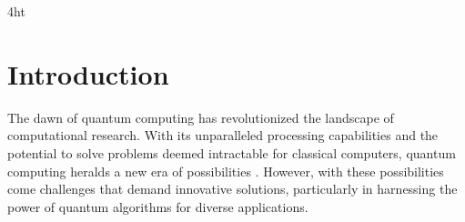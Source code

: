 \documentclass[
  a4paper,  %
  twoside,  %
  bibliography=totoc,
  headsepline,
  cleardoublepage=empty,
  parskip=half,
  draft=false
]{scrbook}
\begin{document}

\printnoidxglossaries

\iftex4ht
\else
\fi



\renewcommand*{\chapterpagestyle}{scrplain}
\pagestyle{scrheadings}
\pagestyle{scrheadings}
\ihead[]{}
\chead[]{}
\ohead[]{\headmark}
\cfoot[]{}
\ifoot[]{}

































%
%

\chapter{Introduction}
\label{chap:introduction}

The dawn of quantum computing has revolutionized the landscape of computational research.
With its unparalleled processing capabilities and the potential to solve problems deemed intractable for classical computers, quantum computing heralds a new era of possibilities \cite{Shor}.
However, with these possibilities come challenges that demand innovative solutions, particularly in harnessing the power of quantum algorithms for diverse applications.
\end{document}
